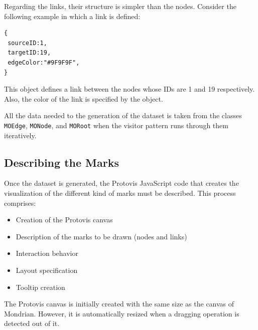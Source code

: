 \documentclass[preprint,10pt]{sigplanconf}
\newcommand{\ct}{\lstinline[backgroundcolor=\color{white},basicstyle=\footnotesize\ttfamily]}
\newcommand{\sv}[1]{\nb{Santiago}{orange}{#1}}
\begin{document}
Regarding the links, their structure is simpler than the nodes. Consider the following example in which a link is defined:
\begin{lstlisting} 
{
 sourceID:1, 
 targetID:19,
 edgeColor:"#9F9F9F",
}
\end{lstlisting}

This object defines a link between the nodes whose IDs are 1 and 19 respectively. Also, the color of the link is specified by the object. 

All the data needed to the generation of the dataset is taken from the classes \ct{MOEdge}, \ct{MONode}, and \ct{MORoot} when the visitor pattern runs through them iteratively.


\subsection{Describing the Marks}

Once the dataset is generated, the Protovis JavaScript code that creates the visualization of the different kind of marks must be described. This process comprises: 
\begin{itemize}
\item Creation of the Protovis canvas
\item Description of the marks to be drawn (nodes and links)
\item Interaction behavior
\item Layout specification
\item Tooltip creation
\end{itemize}

The Protovis canvas is initially created with the same size as the canvas of Mondrian. However, it is automatically resized when a dragging operation is detected out of it.
\end{document}
